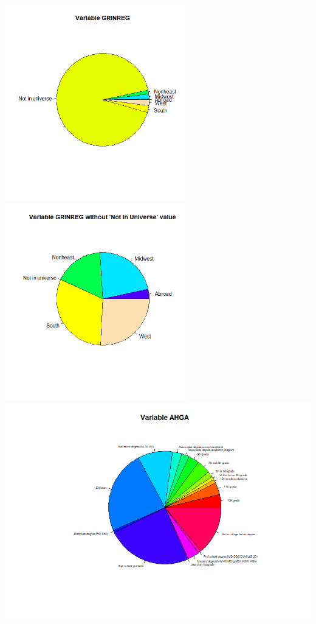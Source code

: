 \documentclass{article}
\begin{document}
\begin{center}
\includegraphics[width=8cm]{GRINREG.png}
\includegraphics[width=8cm]{GRINREG2.png}\\
\includegraphics[width=18cm]{AHGA.png}
\end{center}
\newpage
\end{document}
